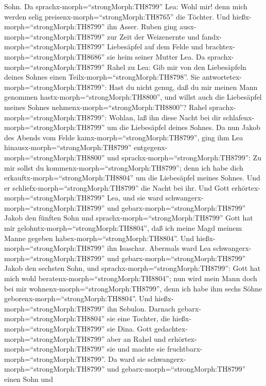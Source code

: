 Sohn.  Da sprachx-morph=``strongMorph:TH8799'' Lea: Wohl
mir! denn mich werden selig preisenx-morph=``strongMorph:TH8765'' die
Töchter. Und hießx-morph=``strongMorph:TH8799'' ihn Asser. 
Ruben ging ausx-morph=``strongMorph:TH8799'' zur Zeit der Weizenernte
und fandx-morph=``strongMorph:TH8799'' Liebesäpfel auf dem Felde und
brachtex-morph=``strongMorph:TH8686'' sie heim seiner Mutter Lea. Da
sprachx-morph=``strongMorph:TH8799'' Rahel zu Lea: Gib mir von den
Liebesäpfeln deines Sohnes einen Teilx-morph=``strongMorph:TH8798''.
 Sie antwortetex-morph=``strongMorph:TH8799'': Hast du
nicht genug, daß du mir meinen Mann genommen
hastx-morph=``strongMorph:TH8800'', und willst auch die Liebesäpfel
meines Sohnes nehmenx-morph=``strongMorph:TH8800''? Rahel
sprachx-morph=``strongMorph:TH8799'': Wohlan, laß ihn diese Nacht bei
dir schlafenx-morph=``strongMorph:TH8799'' um die Liebesäpfel deines
Sohnes.  Da nun Jakob des Abends vom Felde
kamx-morph=``strongMorph:TH8799'', ging ihm Lea
hinausx-morph=``strongMorph:TH8799''
entgegenx-morph=``strongMorph:TH8800'' und
sprachx-morph=``strongMorph:TH8799'': Zu mir sollst du
kommenx-morph=``strongMorph:TH8799''; denn ich habe dich
erkauftx-morph=``strongMorph:TH8804'' um die Liebesäpfel meines Sohnes.
Und er schliefx-morph=``strongMorph:TH8799'' die Nacht bei ihr.
 Und Gott erhörtex-morph=``strongMorph:TH8799'' Lea, und
sie ward schwangerx-morph=``strongMorph:TH8799'' und
gebarx-morph=``strongMorph:TH8799'' Jakob den fünften Sohn 
und sprachx-morph=``strongMorph:TH8799'' Gott hat mir
gelohntx-morph=``strongMorph:TH8804'', daß ich meine Magd meinem Manne
gegeben habex-morph=``strongMorph:TH8804''. Und
hießx-morph=``strongMorph:TH8799'' ihn Isaschar.  Abermals
ward Lea schwangerx-morph=``strongMorph:TH8799'' und
gebarx-morph=``strongMorph:TH8799'' Jakob den sechsten Sohn,
 und sprachx-morph=``strongMorph:TH8799'': Gott hat mich
wohl beratenx-morph=``strongMorph:TH8804''; nun wird mein Mann doch bei
mir wohnenx-morph=``strongMorph:TH8799'', denn ich habe ihm sechs Söhne
geborenx-morph=``strongMorph:TH8804''. Und
hießx-morph=``strongMorph:TH8799'' ihn Sebulon.  Darnach
gebarx-morph=``strongMorph:TH8804'' sie eine Tochter, die
hießx-morph=``strongMorph:TH8799'' sie Dina.  Gott
gedachtex-morph=``strongMorph:TH8799'' aber an Rahel und
erhörtex-morph=``strongMorph:TH8799'' sie und machte sie
fruchtbarx-morph=``strongMorph:TH8799''.  Da ward sie
schwangerx-morph=``strongMorph:TH8799'' und
gebarx-morph=``strongMorph:TH8799'' einen Sohn und
